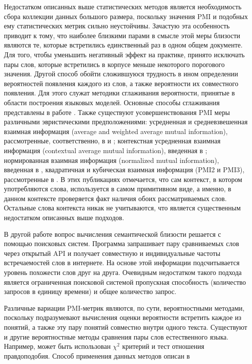 Недостатком описанных выше статистических методов является необходимость сбора коллекции данных большого размера, поскольку значения PMI и подобных ему статистических метрик сильно неустойчивы.  Зачастую эта особенность приводит к тому, что наиболее близкими парами в смысле этой меры близости являются те, которые встретились единственный раз в одном общем документе. Для того, чтобы уменьшить негативный эффект на практике, принято исключать пары слов, которые встретились в корпусе меньше некоторого порогового значения. Другой способ обойти сложившуюся трудность в ином определении вероятностей появления каждого из слов, а также вероятности их совместного появления. Для этого служат методики сглаживания вероятности, принятые в области построения языковых моделей. Основные способы сглаживания представлены в работе \cite{lm}. Также существуют усовершенствования PMI меры различными эвристическими предположениями: усредненная и средневзвешенная взаимная информация (average and weighted average mutual information), рассмотренные, соответственно, в \cite{avg_pmi} и \cite{w_avg_pmi}; контекстная усредненная взаимная информация (contextual average mutual information), введенная в \cite{context_pmi}; нормированная взаимная информация (normalized mutual information), введенная в \cite{npmi}, квадратичная и кубическая взаимная информация (PMI2 и PMI3), рассмотренные в \cite{pmi23}.  В этих публикациях отмечается, что сам контекст, в котором употребляются слова, используется в самом примитивном виде, а именно, в данном контексте проверяется факт наличия обоих рассматриваемых слов. Остальные слова контекста никак не учитываются, что является существенным недостатком описанных выше подходов.

В другой работе \cite{search_eng} вопрос вычисления семантической близости решается с помощью поисковых систем. Программа запрашивает пару сравниваемых слов через открытый API и получает совместную и индивидуальные частоты встречаемостей слов в интернете. На основе этой информации подсчитывается уровень похожести слов друг на друга. Очевидным недостатком такого подхода является ограниченная поисковой системой пропускная способность (количество запросов в единицу времени) и общее количество запрос.

Различные вариации PMI-метрик являются, по сути, вероятностными методами, поскольку подразумевают вычисления оценки вероятности встретить каждое из понятий, а также эту пару понятий совместно внутри одного текста. Существуют и другие вероятностные методы сравнения пары слов естественного языка. Например, может быть использован $\chi^2$ критерий и тест отношения правдоподобия. Способ применения данных методов описан в \cite{freq_est_overview}

